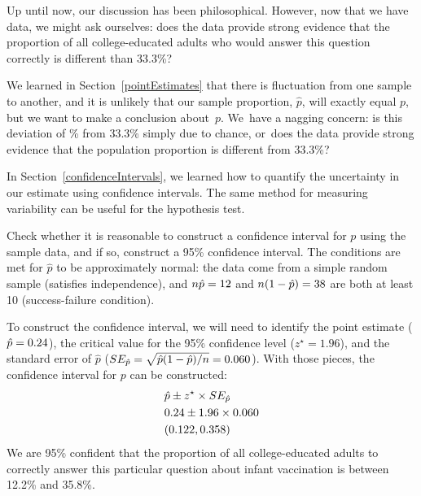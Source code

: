Up until now, our discussion has been philosophical.
However, now that we have data, we might ask ourselves:
does the data provide strong evidence that the proportion
of all college-educated adults who would answer this
question correctly is different than 33.3\%?

We learned in Section~\ref{pointEstimates} that there is
fluctuation from one sample to another, and it is unlikely
that our sample proportion, $\hat{p}$,
will exactly equal $p$, but we want to make
a conclusion about~$p$.
We~have a nagging concern:
is this deviation of \roslingApercent{}\%
from 33.3\% simply due to chance,
or~does the data provide strong evidence that the
population proportion is different from 33.3\%?

In Section~\ref{confidenceIntervals}, we learned how to
quantify the uncertainty in our estimate using confidence
intervals. 
The same method for measuring variability can be useful
for the hypothesis test.

\begin{examplewrap}
\begin{nexample}{Check whether it is reasonable to construct
    a confidence interval for $p$ using the sample data, and
    if so, construct a 95\% confidence interval.}
  The conditions are met for $\hat{p}$ to be approximately
  normal: the data come from a simple random sample (satisfies
  independence), and $n\hat{p} = 12$ and
  $n(1 - \hat{p}) = 38$ are both
  at least 10 (success-failure condition).

  To construct the confidence interval, we will need to identify
  the point estimate ($\hat{p} = 0.24$),
  the critical value for
  the 95\% confidence level ($z^{\star} = 1.96$), and the standard
  error of $\hat{p}$
  ($SE_{\hat{p}} = \sqrt{\hat{p}(1 - \hat{p}) / n} = 0.060$).
  With those pieces, the confidence interval for $p$ can be
  constructed:
  \begin{align*}
    &\hat{p} \pm z^{\star} \times SE_{\hat{p}} \\
    &0.24 \pm 1.96 \times 0.060 \\
    &(0.122, 0.358)
  \end{align*}
  We are 95\% confident that the proportion of all
  college-educated adults to correctly answer this
  particular question about infant vaccination is between
  12.2\% and 35.8\%.
\end{nexample}
\end{examplewrap}

